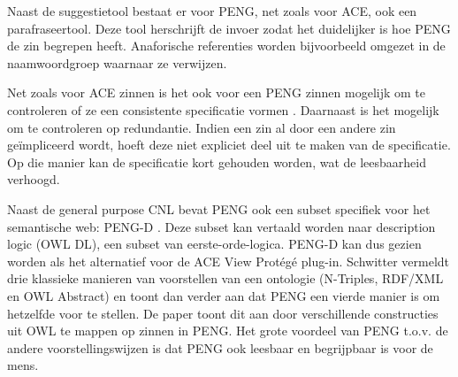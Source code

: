 Naast de suggestietool bestaat er voor PENG, net zoals voor ACE, ook een parafraseertool. Deze tool herschrijft de invoer zodat het duidelijker is hoe PENG de zin begrepen heeft. Anaforische referenties worden bijvoorbeeld omgezet in de naamwoordgroep waarnaar ze verwijzen.

Net zoals voor ACE zinnen is het ook voor een PENG zinnen mogelijk om te controleren of ze een consistente specificatie vormen \cite{Schwitter2004b}. Daarnaast is het mogelijk om te controleren op redundantie. Indien een zin al door een andere zin ge\"impliceerd wordt, hoeft deze niet expliciet deel uit te maken van de specificatie. Op die manier kan de specificatie kort gehouden worden, wat de leesbaarheid verhoogd.

Naast de general purpose CNL bevat PENG ook een subset specifiek voor het semantische web: PENG-D \cite{Schwitter2004}. Deze subset kan vertaald worden naar description logic (OWL DL), een subset van eerste-orde-logica. PENG-D kan dus gezien worden als het alternatief voor de ACE View Prot\'eg\'e plug-in.
Schwitter \cite{Schwitter2006} vermeldt drie klassieke manieren van voorstellen van een ontologie (N-Triples, RDF/XML en OWL Abstract) en toont dan verder aan dat PENG een vierde manier is om hetzelfde voor te stellen. De paper toont dit aan door verschillende constructies uit OWL te mappen op zinnen in PENG. Het grote voordeel van PENG t.o.v. de andere voorstellingswijzen is dat PENG ook leesbaar en begrijpbaar is voor de mens.



